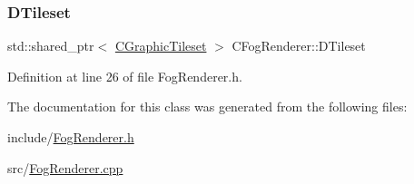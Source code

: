 \subsubsection{\texorpdfstring{D\+Tileset}{DTileset}}
{\footnotesize\ttfamily std\+::shared\+\_\+ptr$<$ \hyperlink{classCGraphicTileset}{C\+Graphic\+Tileset} $>$ C\+Fog\+Renderer\+::\+D\+Tileset\hspace{0.3cm}{\ttfamily [protected]}}



Definition at line 26 of file Fog\+Renderer.\+h.



The documentation for this class was generated from the following files\+:\begin{DoxyCompactItemize}
\item 
include/\hyperlink{FogRenderer_8h}{Fog\+Renderer.\+h}\item 
src/\hyperlink{FogRenderer_8cpp}{Fog\+Renderer.\+cpp}\end{DoxyCompactItemize}
